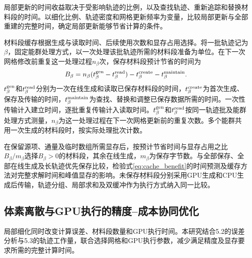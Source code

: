 \documentclass[UTF8, zihao=-4, fontset=none, a4paper]{ctexart}
\begin{document}
局部更新的时间收益取决于受影响轨迹的比例，以及查找轨迹、重新追踪和替换材料段的时间。以细化比例、轨迹密度和网格更新频率为变量，比较局部更新与全部重建的完整时间，确定局部更新能够节省计算的条件。

材料段缓存根据生成与读取时间、后续使用次数和显存占用选择。将一批轨迹记为$\beta$，固定能群处理方式，以一次处理该批轨迹所需的材料段准备为单位。在下一次网格修改前重复这一处理过程$n_\beta$次，保存材料段预计节省的时间为
\begin{equation}
B_\beta=n_\beta(t^{\rm gen}_\beta-t^{\rm read}_\beta)
-t^{\rm create}_\beta-t^{\rm maintain}_\beta.
\label{eq:cache_benefit}
\end{equation}
$t^{\rm gen}_\beta$和$t^{\rm read}_\beta$分别为一次在线生成和读取已保存材料段的时间，$t^{\rm create}_\beta$为首次生成、保存及传输的时间，$t^{\rm maintain}_\beta$为查找、替换和调整已保存数据所需的时间。一次性传输计入建立时间，逐批重复传输计入读取时间。$t^{\rm gen}_\beta$和$t^{\rm read}_\beta$按同一轨迹批及能群处理方式测量，$n_\beta$为这一处理过程在下一次网格更新前的重复次数。多个能群共用一次生成的材料段时，按实际处理批次计数。

在保留源项、通量及临时数组所需显存后，按预计节省时间与显存占用之比$B_\beta/m_\beta$选择$B_\beta>0$的材料段，其余在线生成，$m_\beta$为保存字节数。与全部保存、全部在线生成及长轨迹优先保存比较，检验式\eqref{eq:cache_benefit}的时间预测及缓存方法对完整求解时间和峰值显存的影响。未保存材料段分别采用GPU生成和CPU生成后传输，轨迹分组、局部求和及双缓冲作为执行方式纳入同一比较。

\subsection{体素离散与GPU执行的精度–成本协同优化}
局部细化同时改变计算误差、材料段数量和GPU执行时间。本研究结合5.2的误差分析与5.3的轨迹工作量，联合选择网格和GPU执行参数，减少满足精度及显存要求所需的完整计算时间。
\end{document}
